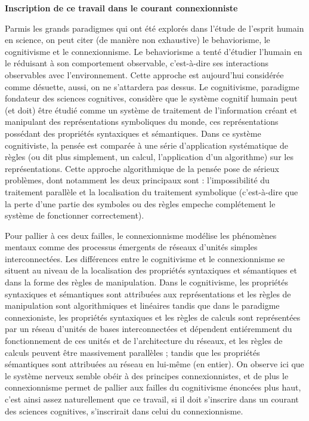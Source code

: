 \documentclass[12pt]{scrartcl}
\begin{document}
\pagebreak

	\textbf{Inscription de ce travail dans le courant connexionniste} 

	Parmis les grands paradigmes qui ont été explorés dans l'étude de l'esprit humain en science, on peut citer (de manière non exhaustive) le behaviorisme, le cognitivisme et le connexionnisme. Le behaviorisme a tenté d'étudier l'humain en le réduisant à son comportement observable, c'est-à-dire ses interactions observables avec l'environnement. Cette approche est aujourd'hui considérée comme désuette, aussi, on ne s'attardera pas dessus. Le cognitivisme, paradigme fondateur des sciences cognitives, considère que le système cognitif humain peut (et doit) être étudié comme un système de traitement de l'information créant et manipulant des représentations symboliques du monde, ces représentations possédant des propriétés syntaxiques et sémantiques. Dans ce système cognitiviste, la pensée est comparée à une série d'application systématique de règles (ou dit plus simplement, un calcul, l'application d'un algorithme) sur les représentations. Cette approche algorithmique de la pensée pose de sérieux problèmes, dont notamment les deux principaux sont : l'impossibilité du traitement parallèle et la localisation du traitement symbolique (c'est-à-dire que la perte d'une partie des symboles ou des règles empeche complétement le système de fonctionner correctement).  

	Pour pallier à ces deux failles, le connexionnisme modélise les phénomènes mentaux comme des processus émergents de réseaux d'unités simples interconnectées. Les différences entre le cognitivisme et le connexionnisme se situent au niveau de la localisation des propriétés syntaxiques et sémantiques et dans la forme des règles de manipulation. Dans le cognitivisme, les propriétés syntaxiques et sémantiques sont attribuées aux représentations et les règles de manipulation sont algorithmiques et linéaires tandis que dans le paradigme connexioniste, les propriétés syntaxiques et les règles de calculs sont représentées par un réseau d'unités de bases interconnectées et dépendent entiéremment du fonctionnement de ces unités et de l'architecture du réseaux, et les règles de calculs peuvent être massivement parallèles ; tandis que les propriétés sémantiques sont attribuées au réseau en lui-même (en entier). On observe ici que le système nerveux semble obéir à des principes connexionnistes, et de plus le connexionnisme permet de pallier aux failles du cognitivisme énoncées plus haut, c'est ainsi assez naturellement que ce travail, si il doit s'inscrire dans un courant des sciences cognitives, s'inscrirait dans celui du connexionnisme.
\end{document}
